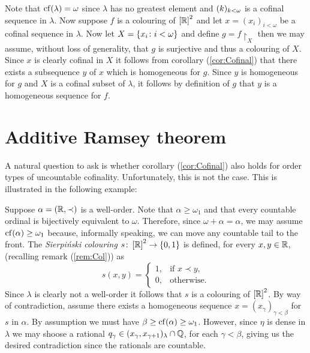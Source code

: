     \begin{exm}
        Note that $\operatorname{cf}(\lambda)=\omega$ since $\lambda$ has no greatest element and $(k)_{k<\omega}$ is a cofinal sequence in $\lambda$.  Now suppose $f$ is a colouring of $\left[\mathbb{R}\right]^{2}$ and let $x=(x_i)_{i<\omega}$ be a cofinal sequence in $\lambda$.  Now let $X=\{ x_i\colon i<\omega \}$ and define $g=f\restriction_X$ then we may assume, without loss of generality, that $g$ is surjective and thus a colouring of $X$.  Since $x$ is clearly cofinal in $X$ it follows from corollary (\ref{cor:Cofinal}) that there exists a subsequence $y$ of $x$ which is homogeneous for $g$.  Since $y$ is homogeneous for $g$ and $X$ is a cofinal subset of $\lambda$, it follows by definition of $g$ that $y$ is a homogeneous sequence for $f$.
    \end{exm}



\section{Additive Ramsey theorem}


    A natural question to ask is whether corollary (\ref{cor:Cofinal}) also holds for order types of uncountable cofinality.  Unfortunately,  this is not the case.  This is illustrated in the following example:
    \begin{exm}
        Suppose $\alpha=(\mathbb{R},\prec)$ is a well-order.  Note that $\alpha\geq\omega_1$ and that every countable ordinal is bijectively equivalent to $\omega$.  Therefore, since $\omega+\alpha=\alpha$, we may assume $\operatorname{cf}(\alpha)\geq\omega_1$ because, informally speaking, we can move any countable tail to the front. The \textit{Sierpi\'nski colouring} $s\colon\left[\mathbb{R}\right]^{2}\to\{0,1\}$ is defined, for every $x,y\in\mathbb{R}$, (recalling remark (\ref{rem:Col})) as
        \begin{equation}
            s(x,y)=
            \begin{cases}
                1,  &\text{if }x\prec y,\\
                0,   &\text{otherwise.}
            \end{cases}
        \end{equation}
        Since $\lambda$ is clearly not a well-order it follows that $s$ is a colouring of $\left[\mathbb{R}\right]^{2}$.  By way of contradiction, assume there exists a homogeneous sequence $x=(x_{\gamma})_{\gamma<\beta}$ for $s$ in $\alpha$.  By assumption we must have $\beta\geq\operatorname{cf}(\alpha)\geq\omega_1$.  However, since $\eta$ is dense in $\lambda$ we may shoose a rational $q_\gamma\in(x_\gamma,x_{\gamma+1})_{\lambda}\cap\mathbb{Q}$, for each $\gamma<\beta$, giving us the desired contradiction since the rationals are countable.
    \end{exm}

